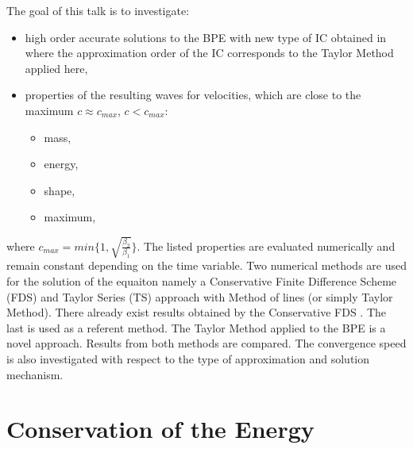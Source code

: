 \documentclass[%
 aip,
cp,  %
 amsmath,amssymb,%
 reprint,%
]{revtex4-2}
\begin{document}
The goal of this talk is to investigate:
\begin{itemize}
 \item high order accurate solutions to the BPE with new type of IC obtained in \cite{ref16} where the approximation order of the IC corresponds to the Taylor Method applied here,
 \item properties of the resulting waves for velocities, which are close to the maximum $c \approx c_{max}$, $c < c_{max}$:
	\begin{itemize}
           \item mass,
	 \item energy,
	 \item shape,
	 \item maximum,
	\end{itemize}
\end{itemize}
where $c_{max} = min\{1, \sqrt{ \frac{\beta_2}{\beta_1} } \}$. The listed properties are evaluated numerically and remain constant depending on the time variable. Two numerical methods are used for the solution of the equaiton namely a Conservative Finite Difference Scheme (FDS) and Taylor Series (TS) approach with Method of lines (or simply Taylor Method). There already exist results obtained by the Conservative FDS \cite{ref20}. The last is used as a referent method. The Taylor Method applied to the BPE is a novel approach. Results from both methods are compared. The convergence speed is also investigated with respect to the type of approximation and solution mechanism.


\section{Conservation of the Energy}
\end{document}
